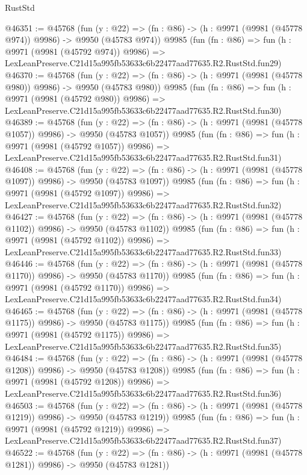 \begin{lexlean}{RustStd}
\begin{coremodule}
@46351 := @45768
    (fun (y : @22) => (fn : @86) -> (h : @9971 (@9981 (@45778 @974)) @9986) -> @9950 (@45783 @974))
    @9985
    (fun (fn : @86) =>
    fun (h : @9971 (@9981 (@45792 @974)) @9986) =>
    LexLeanPreserve.C21d15a995fb53633c6b22477aad77635.R2.RustStd.fun29)
@46370 := @45768
    (fun (y : @22) => (fn : @86) -> (h : @9971 (@9981 (@45778 @980)) @9986) -> @9950 (@45783 @980))
    @9985
    (fun (fn : @86) =>
    fun (h : @9971 (@9981 (@45792 @980)) @9986) =>
    LexLeanPreserve.C21d15a995fb53633c6b22477aad77635.R2.RustStd.fun30)
@46389 := @45768
    (fun (y : @22) =>
    (fn : @86) -> (h : @9971 (@9981 (@45778 @1057)) @9986) -> @9950 (@45783 @1057))
    @9985
    (fun (fn : @86) =>
    fun (h : @9971 (@9981 (@45792 @1057)) @9986) =>
    LexLeanPreserve.C21d15a995fb53633c6b22477aad77635.R2.RustStd.fun31)
@46408 := @45768
    (fun (y : @22) =>
    (fn : @86) -> (h : @9971 (@9981 (@45778 @1097)) @9986) -> @9950 (@45783 @1097))
    @9985
    (fun (fn : @86) =>
    fun (h : @9971 (@9981 (@45792 @1097)) @9986) =>
    LexLeanPreserve.C21d15a995fb53633c6b22477aad77635.R2.RustStd.fun32)
@46427 := @45768
    (fun (y : @22) =>
    (fn : @86) -> (h : @9971 (@9981 (@45778 @1102)) @9986) -> @9950 (@45783 @1102))
    @9985
    (fun (fn : @86) =>
    fun (h : @9971 (@9981 (@45792 @1102)) @9986) =>
    LexLeanPreserve.C21d15a995fb53633c6b22477aad77635.R2.RustStd.fun33)
@46446 := @45768
    (fun (y : @22) =>
    (fn : @86) -> (h : @9971 (@9981 (@45778 @1170)) @9986) -> @9950 (@45783 @1170))
    @9985
    (fun (fn : @86) =>
    fun (h : @9971 (@9981 (@45792 @1170)) @9986) =>
    LexLeanPreserve.C21d15a995fb53633c6b22477aad77635.R2.RustStd.fun34)
@46465 := @45768
    (fun (y : @22) =>
    (fn : @86) -> (h : @9971 (@9981 (@45778 @1175)) @9986) -> @9950 (@45783 @1175))
    @9985
    (fun (fn : @86) =>
    fun (h : @9971 (@9981 (@45792 @1175)) @9986) =>
    LexLeanPreserve.C21d15a995fb53633c6b22477aad77635.R2.RustStd.fun35)
@46484 := @45768
    (fun (y : @22) =>
    (fn : @86) -> (h : @9971 (@9981 (@45778 @1208)) @9986) -> @9950 (@45783 @1208))
    @9985
    (fun (fn : @86) =>
    fun (h : @9971 (@9981 (@45792 @1208)) @9986) =>
    LexLeanPreserve.C21d15a995fb53633c6b22477aad77635.R2.RustStd.fun36)
@46503 := @45768
    (fun (y : @22) =>
    (fn : @86) -> (h : @9971 (@9981 (@45778 @1219)) @9986) -> @9950 (@45783 @1219))
    @9985
    (fun (fn : @86) =>
    fun (h : @9971 (@9981 (@45792 @1219)) @9986) =>
    LexLeanPreserve.C21d15a995fb53633c6b22477aad77635.R2.RustStd.fun37)
@46522 := @45768
    (fun (y : @22) =>
    (fn : @86) -> (h : @9971 (@9981 (@45778 @1281)) @9986) -> @9950 (@45783 @1281))

\end{coremodule}
\end{lexlean}
